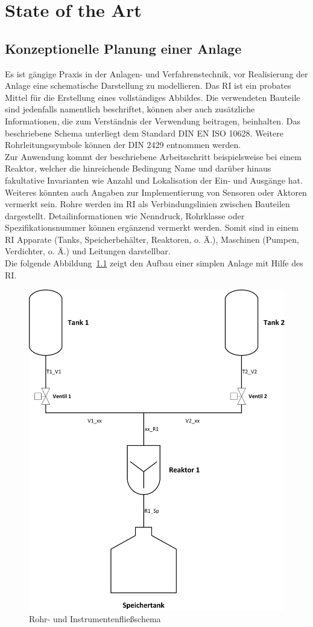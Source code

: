 
\chapter{State of the Art} \label{chapter:stateoftheart}

	\section{Konzeptionelle Planung einer Anlage}
	Es ist gängige Praxis in der Anlagen- und Verfahrenstechnik, vor Realisierung der Anlage eine schematische Darstellung zu modellieren. Das \acf{RI} ist ein probates Mittel für die Erstellung eines vollständiges Abbildes. Die verwendeten Bauteile sind jedenfalls namentlich beschriftet, können aber auch zusätzliche Informationen, die zum Verständnis der Verwendung beitragen, beinhalten. Das beschriebene Schema unterliegt dem Standard DIN EN ISO 10628. Weitere Rohrleitungssymbole können der DIN 2429 entnommen werden.\\

	Zur Anwendung kommt der beschriebene Arbeitsschritt beispielsweise bei einem Reaktor, welcher die hinreichende Bedingung \glqq Name \grqq \space und darüber hinaus fakultative Invarianten wie Anzahl und Lokalisation der Ein- und Ausgänge hat. Weiteres könnten auch Angaben zur Implementierung von Sensoren oder Aktoren vermerkt sein. Rohre werden im \ac{RI} als Verbindungslinien zwischen Bauteilen dargestellt. Detailinformationen wie Nenndruck, Rohrklasse oder Spezifikationsnummer können ergänzend vermerkt werden. Somit sind in einem \ac{RI} Apparate (Tanks, Speicherbehälter, Reaktoren, o. Ä.), Maschinen (Pumpen, Verdichter, o. Ä.) und Leitungen darstellbar.\\
	
	Die folgende Abbildung~\ref{fig:RI_SotA} zeigt den Aufbau einer simplen Anlage mit Hilfe des \ac{RI}.\\

	\begin{figure}[h!]
  		\centering
		\includegraphics[height=0.65\textwidth]{graphics/stateoftheart/RI_SotA.jpg}
		\caption{Rohr- und Instrumentenfließschema}
		\label{fig:RI_SotA}
	\end{figure}


